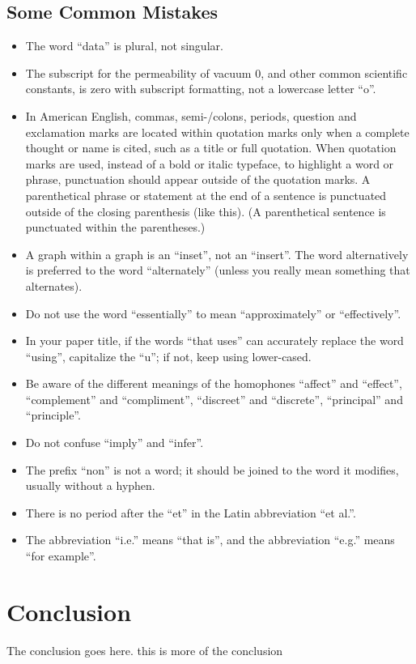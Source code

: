\documentclass[10pt, conference, a4paper, compsocconf]{IEEEtran}
\begin{document}
\subsection{Some Common Mistakes}
\begin{itemize}
\item The word “data” is plural, not singular.
\item The subscript for the permeability of vacuum 0, and other common scientific constants, is zero with subscript formatting, not a lowercase letter “o”.
\item In American English, commas, semi-/colons, periods, question and exclamation marks are located within quotation marks only when a complete thought or name is cited, such as a title or full quotation. When quotation marks are used, instead of a bold or italic typeface, to highlight a word or phrase, punctuation should appear outside of the quotation marks. A parenthetical phrase or statement at the end of a sentence is punctuated outside of the closing parenthesis (like this). (A parenthetical sentence is punctuated within the parentheses.)
\item A graph within a graph is an “inset”, not an “insert”. The word alternatively is preferred to the word “alternately” (unless you really mean something that alternates).
\item Do not use the word “essentially” to mean “approximately” or “effectively”.
\item In your paper title, if the words “that uses” can accurately replace the word “using”, capitalize the “u”; if not, keep using lower-cased.
\item Be aware of the different meanings of the homophones “affect” and “effect”, “complement” and “compliment”, “discreet” and “discrete”, “principal” and “principle”.
\item Do not confuse “imply” and “infer”.
\item The prefix “non” is not a word; it should be joined to the word it modifies, usually without a hyphen.
\item There is no period after the “et” in the Latin abbreviation “et al.”.
\item The abbreviation “i.e.” means “that is”, and the abbreviation “e.g.” means “for example”.
\end{itemize}

\section{Conclusion}
The conclusion goes here. this is more of the conclusion
\end{document}
